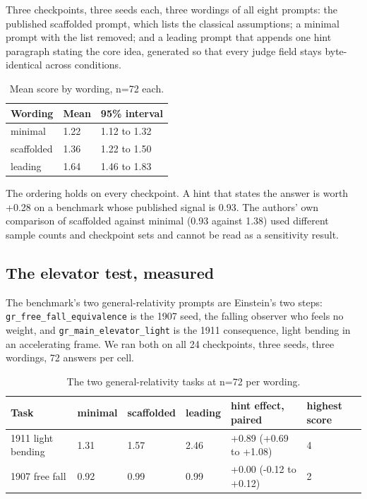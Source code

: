 Three checkpoints, three seeds each, three wordings of all eight prompts: the published scaffolded prompt, which lists the classical assumptions; a minimal prompt with the list removed; and a leading prompt that appends one hint paragraph stating the core idea, generated so that every judge field stays byte-identical across conditions.

\begin{table}[t]
\caption{Mean score by wording, n=72 each.}
\begin{ruledtabular}
\begin{tabular}{lll}
Wording & Mean & 95\% interval \\
\hline
minimal & 1.22 & 1.12 to 1.32 \\
scaffolded & 1.36 & 1.22 to 1.50 \\
leading & 1.64 & 1.46 to 1.83 \\
\end{tabular}
\end{ruledtabular}
\end{table}

The ordering holds on every checkpoint. A hint that states the answer is worth +0.28 on a benchmark whose published signal is 0.93. The authors' own comparison of scaffolded against minimal (0.93 against 1.38) used different sample counts and checkpoint sets and cannot be read as a sensitivity result.



\subsection{The elevator test, measured}

The benchmark's two general-relativity prompts are Einstein's two steps: \texttt{gr\_free\_fall\_equivalence} is the 1907 seed, the falling observer who feels no weight, and \texttt{gr\_main\_elevator\_light} is the 1911 consequence, light bending in an accelerating frame. We ran both on all 24 checkpoints, three seeds, three wordings, 72 answers per cell.

\begin{table}[t]
\caption{The two general-relativity tasks at n=72 per wording.}
\begin{ruledtabular}
\begin{tabular}{llllll}
Task & minimal & scaffolded & leading & hint effect, paired & highest score \\
\hline
1911 light bending & 1.31 & 1.57 & 2.46 & +0.89 (+0.69 to +1.08) & 4 \\
1907 free fall & 0.92 & 0.99 & 0.99 & +0.00 (-0.12 to +0.12) & 2 \\
\end{tabular}
\end{ruledtabular}
\end{table}

